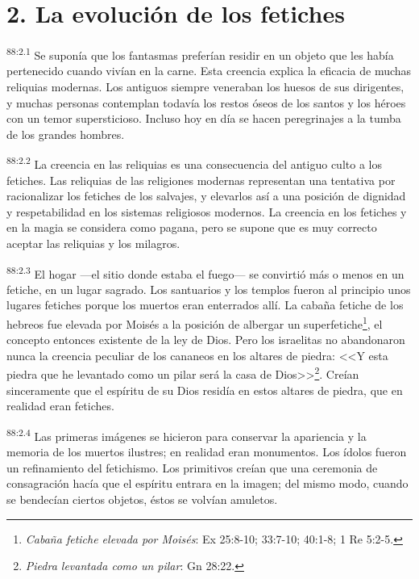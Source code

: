 \section*{2. La evolución de los fetiches}
\par
\textsuperscript{88:2.1} Se suponía que los fantasmas preferían residir en un objeto que les había pertenecido cuando vivían en la carne. Esta creencia explica la eficacia de muchas reliquias modernas. Los antiguos siempre veneraban los huesos de sus dirigentes, y muchas personas contemplan todavía los restos óseos de los santos y los héroes con un temor supersticioso. Incluso hoy en día se hacen peregrinajes a la tumba de los grandes hombres.

\par
\textsuperscript{88:2.2} La creencia en las reliquias es una consecuencia del antiguo culto a los fetiches. Las reliquias de las religiones modernas representan una tentativa por racionalizar los fetiches de los salvajes, y elevarlos así a una posición de dignidad y respetabilidad en los sistemas religiosos modernos. La creencia en los fetiches y en la magia se considera como pagana, pero se supone que es muy correcto aceptar las reliquias y los milagros.

\par
\textsuperscript{88:2.3} El hogar ---el sitio donde estaba el fuego--- se convirtió más o menos en un fetiche, en un lugar sagrado. Los santuarios y los templos fueron al principio unos lugares fetiches porque los muertos eran enterrados allí. La cabaña fetiche de los hebreos fue elevada por Moisés a la posición de albergar un superfetiche\footnote{\textit{Cabaña fetiche elevada por Moisés}: Ex 25:8-10; 33:7-10; 40:1-8; 1 Re 5:2-5.}, el concepto entonces existente de la ley de Dios. Pero los israelitas no abandonaron nunca la creencia peculiar de los cananeos en los altares de piedra: <<Y esta piedra que he levantado como un pilar será la casa de Dios>>\footnote{\textit{Piedra levantada como un pilar}: Gn 28:22.}. Creían sinceramente que el espíritu de su Dios residía en estos altares de piedra, que en realidad eran fetiches.

\par
\textsuperscript{88:2.4} Las primeras imágenes se hicieron para conservar la apariencia y la memoria de los muertos ilustres; en realidad eran monumentos. Los ídolos fueron un refinamiento del fetichismo. Los primitivos creían que una ceremonia de consagración hacía que el espíritu entrara en la imagen; del mismo modo, cuando se bendecían ciertos objetos, éstos se volvían amuletos.


